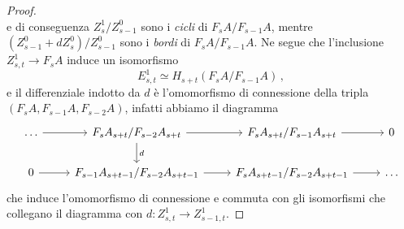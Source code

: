 \begin{thm}
\begin{proof}
\begin{equation*}
		\end{equation*}
		e di conseguenza $Z^{1}_{s}/Z^{0}_{s-1}$ sono i \emph{cicli} di $F_{s}A/F_{s-1}A$,
		mentre $(Z^{0}_{s-1} + dZ_{s}^{0})/Z^{0}_{s-1}$ sono i \emph{bordi} di $F_{s}A/F_{s-1}A$.
		Ne segue che l'inclusione $Z_{s,t}^{1} \to F_{s}A$ induce un isomorfismo
		\begin{equation*}
			E^{1}_{s,t} \simeq H_{s+t}\left( F_{s}A/F_{s-1}A \right)\,,
		\end{equation*}
		e il differenziale indotto da $d$ è l'omomorfismo di connessione della tripla
		$(F_{s}A, F_{s-1}A, F_{s-2}A)$, infatti abbiamo il diagramma
		\begin{equation*}
			\begin{tikzcd}
				\dots \ar[r] & F_{s}A_{s+t}/F_{s-2}A_{s+t} \ar[r] \ar[d, "d"] 
				& F_{s}A_{s+t}/F_{s-1}A_{s+t} \ar[r] & 0 \\
				0 \ar[r] & F_{s-1}A_{s+t-1}/F_{s-2}A_{s+t-1} \ar[r]
				& F_{s}A_{s+t-1}/F_{s-2}A_{s+t-1} \ar[r] & \dots
			\end{tikzcd}
		\end{equation*}
		che induce l'omomorfismo di connessione e commuta con gli isomorfismi 
		che collegano il diagramma con 
		$d : Z^{1}_{s,t} \to Z^{1}_{s-1,t}$.
		

\end{proof}
\end{thm}
